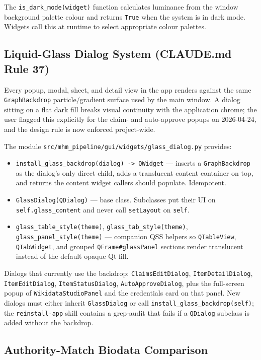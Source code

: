 \documentclass[12pt]{article}
\newcommand{\filepath}[1]{\texttt{\small #1}}
\newcommand{\code}[1]{\texttt{#1}}
\begin{document}
The \code{is\_dark\_mode(widget)} function calculates luminance from the window background palette colour and returns \code{True} when the system is in dark mode. Widgets call this at runtime to select appropriate colour palettes.

\subsection{Liquid-Glass Dialog System (CLAUDE.md Rule 37)}
\label{sec:liquid-glass}

Every popup, modal, sheet, and detail view in the app renders against the same \code{GraphBackdrop} particle/gradient surface used by the main window. A dialog sitting on a flat dark fill breaks visual continuity with the application chrome; the user flagged this explicitly for the claim- and auto-approve popups on 2026-04-24, and the design rule is now enforced project-wide.

The module \filepath{src/mhm\_pipeline/gui/widgets/glass\_dialog.py} provides:

\begin{itemize}
\item \code{install\_glass\_backdrop(dialog) -> QWidget} --- inserts a \code{GraphBackdrop} as the dialog's only direct child, adds a translucent content container on top, and returns the content widget callers should populate. Idempotent.
\item \code{GlassDialog(QDialog)} --- base class. Subclasses put their UI on \code{self.glass\_content} and never call \code{setLayout} on \code{self}.
\item \code{glass\_table\_style(theme)}, \code{glass\_tab\_style(theme)}, \code{glass\_panel\_style(theme)} --- companion QSS helpers so \code{QTableView}, \code{QTabWidget}, and grouped \code{QFrame\#glassPanel} sections render translucent instead of the default opaque Qt fill.
\end{itemize}

Dialogs that currently use the backdrop: \code{ClaimsEditDialog}, \code{ItemDetailDialog}, \code{ItemEditDialog}, \code{ItemStatusDialog}, \code{AutoApproveDialog}, plus the full-screen popup of \code{WikidataStudioPanel} and the credentials card on that panel. New dialogs must either inherit \code{GlassDialog} or call \code{install\_glass\_backdrop(self)}; the \code{reinstall-app} skill contains a grep-audit that fails if a \code{QDialog} subclass is added without the backdrop.

\subsection{Authority-Match Biodata Comparison}
\label{sec:biodata-compare}
\end{document}
